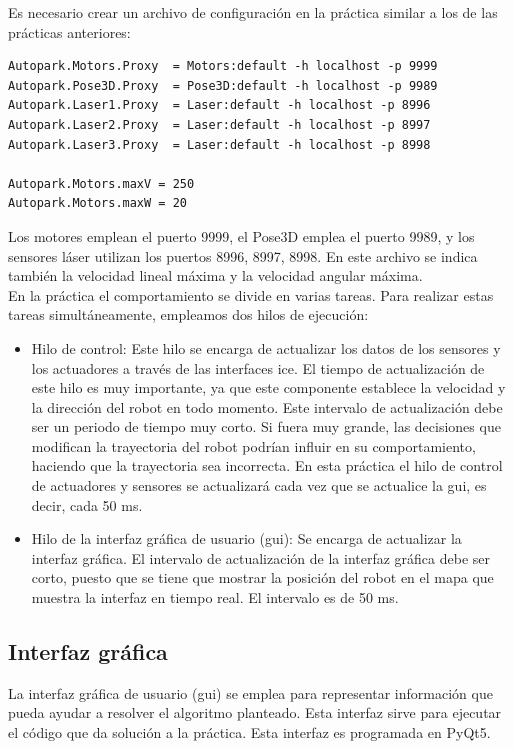 Es necesario crear un archivo de configuración en la práctica similar a los de las prácticas anteriores:

\vspace{20pt}
	\begin{lstlisting}[frame=single]
Autopark.Motors.Proxy  = Motors:default -h localhost -p 9999
Autopark.Pose3D.Proxy  = Pose3D:default -h localhost -p 9989
Autopark.Laser1.Proxy  = Laser:default -h localhost -p 8996
Autopark.Laser2.Proxy  = Laser:default -h localhost -p 8997
Autopark.Laser3.Proxy  = Laser:default -h localhost -p 8998

Autopark.Motors.maxV = 250
Autopark.Motors.maxW = 20

	\end{lstlisting}


Los motores emplean el puerto 9999, el Pose3D emplea el puerto 9989, y los sensores láser utilizan los puertos 8996, 8997, 8998. En este archivo se indica también la velocidad lineal máxima y la velocidad angular máxima.\\

En la práctica el comportamiento se divide en varias tareas. Para realizar estas tareas simultáneamente, empleamos dos hilos de ejecución:

\begin{itemize}
\item Hilo de control: Este hilo se encarga de actualizar los datos de los sensores y los actuadores a través de las interfaces \acrshort{ice}. El tiempo de actualización de este hilo es muy importante, ya que este componente establece la velocidad y la dirección del robot en todo momento. Este intervalo de actualización debe ser un periodo de tiempo muy corto. Si fuera muy grande, las decisiones que modifican la trayectoria del robot podrían influir en su comportamiento, haciendo que la trayectoria sea incorrecta. En esta práctica el hilo de control de actuadores y sensores se actualizará cada vez que se actualice la \acrshort{gui}, es decir, cada 50 ms.
\item	Hilo de la interfaz gráfica de usuario (\acrshort{gui}): Se encarga de actualizar la interfaz gráfica. El intervalo de actualización de la interfaz gráfica debe ser corto, puesto que se tiene que mostrar la posición del robot en el mapa que muestra la interfaz en tiempo real. El intervalo es de 50 ms.

\end{itemize}

\subsection{Interfaz gráfica}
La interfaz gráfica de usuario (\acrshort{gui}) se emplea para representar información que pueda ayudar a resolver el algoritmo planteado. Esta interfaz sirve para ejecutar el código que da solución a la práctica. Esta interfaz es programada en PyQt5.\\


